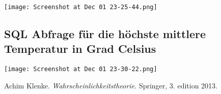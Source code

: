 \documentclass{article}
\begin{document}
\texttt{[image: Screenshot at Dec 01 23-25-44.png]}

\subsection{SQL Abfrage für die höchste mittlere Temperatur in Grad Celsius }

\texttt{[image: Screenshot at Dec 01 23-30-22.png]}




\newpage
\begin{thebibliography}{9}
     Achim Klenke. \emph{Wahrscheinlichkeitstheorie.} Springer, 3. edition 2013.
\end{thebibliography}
\end{document}

